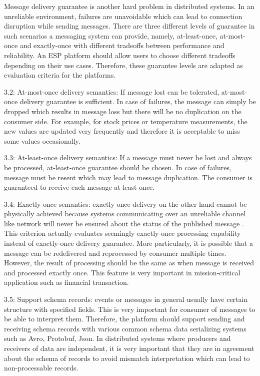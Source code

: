 Message delivery guarantee is another hard problem in distributed systems. In an unreliable environment, failures are unavoidable which can lead to connection disruption while sending messages. There are three different levels of guarantee in such scenarios a messaging system can provide, namely, at-least-once, at-most-once and exactly-once with different tradeoffs between performance and reliability. An ESP platform should allow users to choose different tradeoffs depending on their use cases. Therefore, these guarantee levels are adapted as evaluation criteria for the platforms.

3.2: At-most-once delivery semantics: If message lost can be tolerated, at-most-once delivery guarantee is sufficient. In case of failures, the message can simply be dropped which results in message loss but there will be no duplication on the consumer side. For example, for stock prices or temperature measurements, the new values are updated very frequently and therefore it is acceptable to miss some values occasionally. 

3.3: At-least-once delivery semantics: If a message must never be lost and always be processed, at-least-once guarantee should be chosen. In case of failures, message must be resent which may lead to message duplication. The consumer is guaranteed to receive each message at least once. 

3.4: Exactly-once semantics: exactly once delivery on the other hand cannot be physically achieved because systems communicating over an unreliable channel like network will never be ensured about the status of the published message \cite{exactlyoncenotpossible}. This criterion actually evaluates seemingly exactly-once processing capability instead of exactly-once delivery guarantee. More particularly, it is possible that a message can be redelivered and reprocessed by consumer multiple times. However, the result of processing should be the same as when message is received and processed exactly once. This feature is very important in mission-critical application such as financial transaction.

3.5: Support schema records: events or messages in general usually have certain structure with specified fields. This is very important for consumer of messages to be able to interpret them. Therefore, the platform should support sending and receiving schema records with various common schema data serializing systems such as Avro, Protobuf, Json. 
In distributed systems where producers and receivers of data are independent, it is very important that they are in agreement about the schema of records to avoid mismatch interpretation which can lead to non-processable records. 

